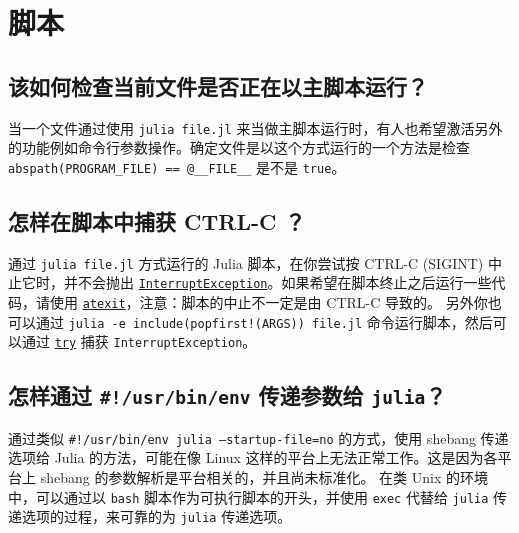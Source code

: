 \section{脚本}



\hypertarget{14939284717840791757}{}


\subsection{该如何检查当前文件是否正在以主脚本运行？}



当一个文件通过使用 \texttt{julia file.jl} 来当做主脚本运行时，有人也希望激活另外的功能例如命令行参数操作。确定文件是以这个方式运行的一个方法是检查 \texttt{abspath(PROGRAM\_FILE) == @\_\_FILE\_\_} 是不是 \texttt{true}。



\hypertarget{5414221961728470242}{}


\subsection{怎样在脚本中捕获 CTRL-C ？}



通过 \texttt{julia file.jl} 方式运行的 Julia 脚本，在你尝试按 CTRL-C (SIGINT) 中止它时，并不会抛出 \hyperlink{11255134339055983338}{\texttt{InterruptException}}。如果希望在脚本终止之后运行一些代码，请使用 \hyperlink{17479944696971324992}{\texttt{atexit}}，注意：脚本的中止不一定是由 CTRL-C 导致的。 另外你也可以通过 \texttt{julia -e {\textquotesingle}include(popfirst!(ARGS)){\textquotesingle} file.jl} 命令运行脚本，然后可以通过 \hyperlink{16338536928035025961}{\texttt{try}} 捕获 \texttt{InterruptException}。



\hypertarget{15272704088350857853}{}


\subsection{怎样通过 \texttt{\#!/usr/bin/env} 传递参数给 \texttt{julia}？}



通过类似 \texttt{\#!/usr/bin/env julia --startup-file=no} 的方式，使用 shebang 传递选项给 Julia 的方法，可能在像 Linux 这样的平台上无法正常工作。这是因为各平台上 shebang 的参数解析是平台相关的，并且尚未标准化。 在类 Unix 的环境中，可以通过以 \texttt{bash} 脚本作为可执行脚本的开头，并使用 \texttt{exec} 代替给 \texttt{julia} 传递选项的过程，来可靠的为 \texttt{julia} 传递选项。




